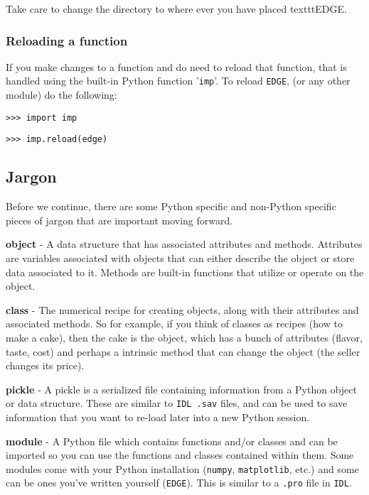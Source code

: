 \documentclass{emulateapj}
\begin{document}
Take care to change the directory to where ever you have placed texttt{EDGE}.

\subsubsection{Reloading a function}

If you make changes to a function and do need to reload that function, that is handled using the built-in Python function '\texttt{imp}'. To reload \texttt{EDGE}, (or any other module) do the following:

\vspace{2mm}
\texttt{>>> import imp}

\texttt{>>> imp.reload(edge)}
\vspace{2mm}

\subsection{Jargon}  
 
Before we continue, there are some Python specific and non-Python specific pieces of jargon that are important moving forward.
 
\vspace{2mm}

\noindent \textbf{object} - A data structure that has associated attributes and methods. Attributes are variables associated with objects that can either describe the object or store data associated to it. Methods are built-in functions that utilize or operate on the object.

\noindent \textbf{class} - The numerical recipe for creating objects, along with their attributes and associated methods. So for example, if you think of classes as recipes (how to make a cake), then the cake is the object, which has a bunch of attributes (flavor, taste, cost) and perhaps a intrinsic method that can change the object (the seller changes its price).

\noindent \textbf{pickle} - A pickle is a serialized file containing information from a Python object or data structure. These are similar to \texttt{IDL .sav} files, and can be used to save information that you want to re-load later into a new Python session. 
 
\noindent \textbf{module} - A Python file which contains functions and/or classes and can be imported so you can use the functions and classes contained within them. Some modules come with your Python installation (\texttt{numpy}, \texttt{matplotlib}, etc.) and some can be ones you’ve written yourself (\texttt{EDGE}). This is similar to a \texttt{.pro} file in \texttt{IDL}. 
 
\end{document}
